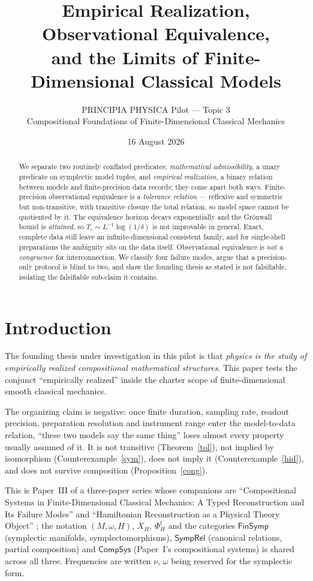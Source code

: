 \documentclass[12pt,a4paper]{article}
\title{\bf Empirical Realization, Observational Equivalence,\\ and the Limits of Finite-Dimensional Classical Models}
\author{PRINCIPIA PHYSICA Pilot --- Topic 3\\[2pt]
\small Compositional Foundations of Finite-Dimensional Classical Mechanics}
\date{16 August 2026}
\theoremstyle{definition}
\theoremstyle{plain}
\theoremstyle{commentary}
\newcommand{\FinSymp}{\mathsf{FinSymp}}
\newcommand{\SympRel}{\mathsf{SympRel}}
\newcommand{\CompSys}{\mathsf{CompSys}}
\newcommand{\eps}{\varepsilon}
\begin{document}
\maketitle
\begin{abstract}
\noindent
We separate two routinely conflated predicates: \emph{mathematical admissibility}, a unary predicate on symplectic model tuples, and \emph{empirical realization}, a binary relation between models and finite-precision data records; they come apart both ways. Finite-precision observational equivalence is a \emph{tolerance relation} --- reflexive and symmetric but non-transitive, with transitive closure the total relation, so model space cannot be quotiented by it. The equivalence horizon decays exponentially and the Gr\"onwall bound is \emph{attained}, so $T_\eps\sim L^{-1}\log(1/\delta)$ is not improvable in general. Exact, complete data still leave an infinite-dimensional consistent family, and for single-shell preparations the ambiguity sits on the data itself. Observational equivalence is \emph{not a congruence} for interconnection. We classify four failure modes, argue that a precision-only protocol is blind to two, and show the founding thesis as stated is not falsifiable, isolating the falsifiable sub-claim it contains.
\end{abstract}

\section{Introduction}
\label{s1}

The founding thesis under investigation in this pilot is that \emph{physics is the study of empirically realized compositional mathematical structures}. This paper tests the conjunct ``empirically realized'' inside the charter scope of finite-dimensional smooth classical mechanics.

The organizing claim is negative: once finite duration, sampling rate, readout precision, preparation resolution and instrument range enter the model-to-data relation, ``these two models say the same thing'' loses almost every property usually assumed of it. It is not transitive (Theorem~\ref{tol}), not implied by isomorphism (Counterexample~\ref{sym}), does not imply it (Counterexample~\ref{hid}), and does not survive composition (Proposition~\ref{cong}).

This is Paper~III of a three-paper series whose companions are ``Compositional Systems in Finite-Dimensional Classical Mechanics: A Typed Reconstruction and Its Failure Modes'' \cite{PaperI} and ``Hamiltonian Reconstruction as a Physical Theory Object'' \cite{PaperII}; the notation $(M,\omega,H)$, $X_H$, $\Phi^t_H$ and the categories $\FinSymp$ (symplectic manifolds, symplectomorphisms), $\SympRel$ (canonical relations, partial composition) and $\CompSys$ (Paper~I's compositional systems) is shared across all three. Frequencies are written $\nu$, $\omega$ being reserved for the symplectic form.
\end{document}
